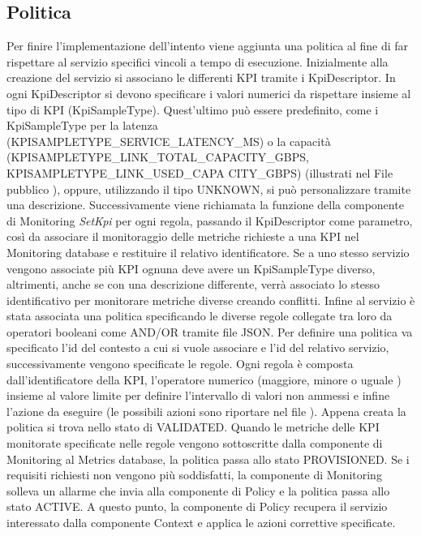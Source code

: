 \subsection{Politica}
Per finire l'implementazione dell'intento viene aggiunta una politica al fine di far rispettare al servizio specifici vincoli 
a tempo di esecuzione. 
\newline Inizialmente alla creazione del servizio si associano le differenti KPI tramite i KpiDescriptor.
In ogni KpiDescriptor  si devono specificare i valori numerici da rispettare insieme al tipo di KPI (KpiSampleType).
Quest'ultimo può essere predefinito,
come i KpiSampleType per la latenza (KPISAMPLETYPE\_SERVICE\_LATENCY\_MS) o la capacità (KPISAMPLETYPE\_LINK\_TOTAL\_CAPACITY\_GBPS,  KPISAMPLETYPE\_LINK\_USED\_CAPA CITY\_GBPS) (illustrati nel File pubblico \cite{kpi}),
oppure, utilizzando il tipo UNKNOWN, si può personalizzare tramite una descrizione.
\newline Successivamente viene richiamata la funzione della componente di Monitoring \textit{SetKpi} per ogni regola, passando il KpiDescriptor come parametro, così da
associare il monitoraggio delle metriche richieste a una KPI nel Monitoring database e restituire il relativo identificatore.
Se a uno stesso servizio vengono associate più KPI ognuna deve avere un KpiSampleType diverso, altrimenti, anche se con una descrizione differente,
verrà associato lo stesso identificativo per monitorare metriche diverse creando conflitti. 
Infine al servizio è stata associata una politica specificando le diverse regole collegate tra loro da operatori booleani come AND/OR tramite file JSON.
Per definire una politica va specificato l'id del contesto a cui si vuole associare e l'id del relativo servizio, successivamente vengono specificate le regole.
Ogni regola è composta dall'identificatore della KPI, l'operatore numerico (maggiore, minore o uguale \cite{op}) insieme al valore limite 
per definire l'intervallo di valori non ammessi e infine l'azione da eseguire (le possibili azioni sono riportare nel file \cite{az}).
Appena creata la politica si trova nello stato di VALIDATED. Quando le metriche delle KPI monitorate
specificate nelle regole vengono sottoscritte dalla componente di Monitoring al Metrics database, la politica passa allo stato PROVISIONED.
Se i requisiti richiesti non vengono più soddisfatti, la componente di Monitoring solleva un allarme che invia alla componente di Policy
e la politica passa allo stato ACTIVE.
A questo punto, la componente di Policy recupera il servizio interessato dalla componente Context e applica le azioni correttive specificate.
